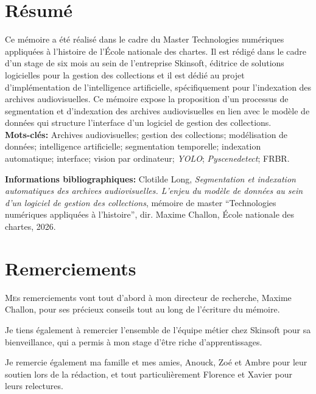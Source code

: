 \documentclass[12pt,twoside]{book}
\begin{document}
\frontmatter

	\chapter{Résumé}
\medskip
	Ce mémoire a été réalisé dans le cadre du Master Technologies numériques appliquées à l’histoire de l’École nationale des chartes. Il est rédigé dans le cadre d'un stage de six mois au sein de l'entreprise Skinsoft, éditrice de solutions logicielles pour la gestion des collections et il est dédié au projet d'implémentation de l'intelligence artificielle, spécifiquement pour l'indexation des archives audiovisuelles. Ce mémoire expose la proposition d'un processus de segmentation et d'indexation des archives audiovisuelles en lien avec le modèle de données qui structure l'interface d'un logiciel de gestion des collections.\\
	
	\textbf{Mots-clés:} Archives audiovisuelles; gestion des collections; modélisation de données; intelligence artificielle; segmentation temporelle; indexation automatique; interface; vision par ordinateur; \textit{YOLO}; \textit{Pyscenedetect}; FRBR.
	
	\textbf{Informations bibliographiques:} Clotilde Long, \textit{Segmentation et indexation automatiques des archives audiovisuelles. L'enjeu du modèle de données au sein d'un logiciel de gestion des collections}, mémoire de master \enquote{Technologies numériques appliquées à l'histoire}, dir. Maxime Challon, École nationale des chartes, 2026.
	
	
	
		\newpage{\pagestyle{empty}\cleardoublepage}

	
	\chapter{Remerciements}
	
\lettrine{M}es remerciements vont tout d'abord à mon directeur de recherche, Maxime Challon, pour ses précieux conseils tout au long de l'écriture du mémoire. 

Je tiens également à remercier l'ensemble de l'équipe métier chez Skinsoft pour sa bienveillance, qui a permis à mon stage d'être riche d'apprentissages. 

Je remercie également ma famille et mes amies, Anouck, Zoé et Ambre pour leur soutien lors de la rédaction, et tout particulièrement Florence et Xavier pour leurs relectures. 
\end{document}
